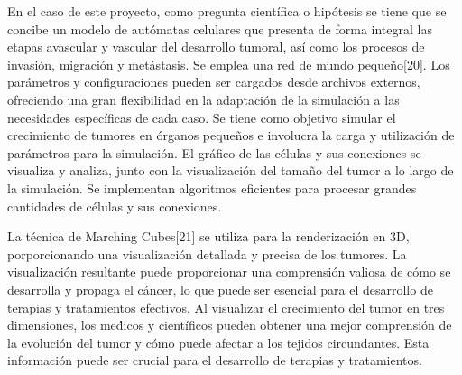 \hspace{.1cm}En el caso de este proyecto, como pregunta científica o hip\'otesis se tiene que se concibe un modelo de autómatas celulares que presenta de forma integral las etapas avascular y vascular del desarrollo tumoral, así como los procesos de invasión, migración y metástasis. Se emplea una red de mundo pequeño[20]. Los parámetros y configuraciones pueden ser cargados desde archivos externos, ofreciendo una gran flexibilidad en la adaptación de la simulación a las necesidades específicas de cada caso. Se tiene como objetivo simular el crecimiento de tumores en órganos pequeños e involucra la carga y utilización de parámetros para la simulación. El gráfico de las células y sus conexiones se visualiza y analiza, junto con la visualización del tamaño del tumor a lo largo de la simulación. Se implementan algoritmos eficientes para procesar grandes cantidades de células y sus conexiones.

\hspace{.1cm}La técnica de Marching Cubes[21] se utiliza para la renderizaci\'on en 3D, porporcionando una visualizaci\'on detallada y precisa de los tumores. La visualizaci\'on resultante puede proporcionar una comprensión valiosa de cómo se desarrolla y propaga el cáncer, lo que puede ser esencial para el desarrollo de terapias y tratamientos efectivos. Al visualizar el crecimiento del tumor en tres dimensiones, los me\'dicos y cient\'ificos pueden obtener una mejor comprensi\'on de la evoluci\'on del tumor y cómo puede afectar a los tejidos circundantes. Esta informaci\'on puede ser crucial para el desarrollo de terapias y tratamientos.

